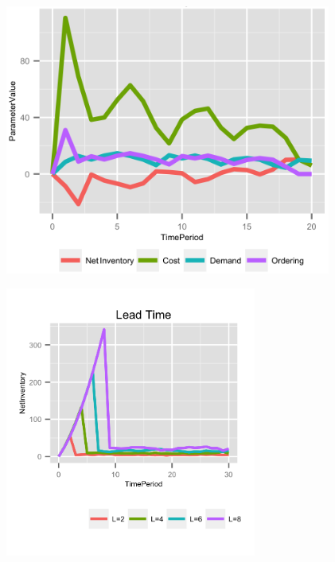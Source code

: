 \documentclass{beamer}
\begin{document}
\begin{frame}
  \includegraphics[height=3.5in]{figures/DualBalancingParameters.png}
\end{frame}

\begin{frame}
  \includegraphics[height=3.5in]{figures/LeadTime.png}
\end{frame}


\end{document}
